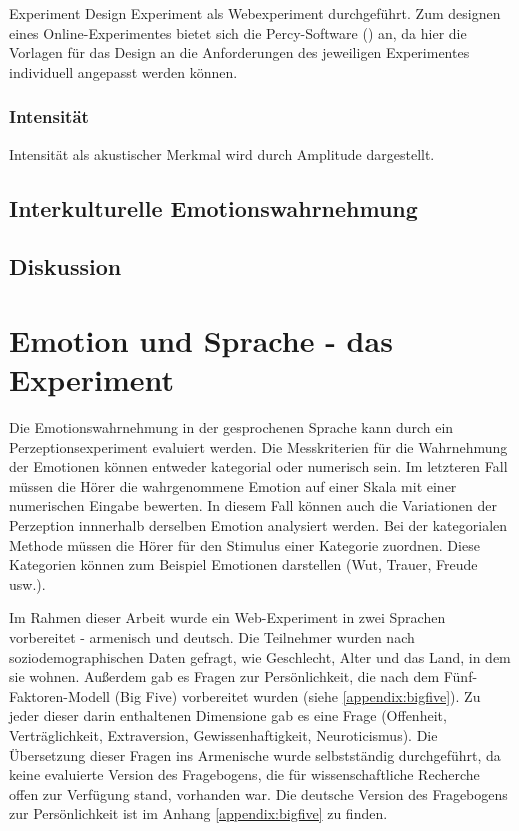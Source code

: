 \documentclass[11pt,a4paper,headsepline,twoside,toc=bibliography]{scrreprt}
\begin{document}
\bigskip

Experiment Design
Experiment als Webexperiment durchgeführt.
Zum designen eines Online-Experimentes bietet sich die Percy-Software (\cite{Draxler2011}) an, da hier die Vorlagen für das Design an die Anforderungen des jeweiligen Experimentes individuell angepasst werden können.


\subsection{Intensität}
\label{intensity}

Intensität als akustischer Merkmal wird durch Amplitude dargestellt.



\section{Interkulturelle Emotionswahrnehmung}


\section{Diskussion}
\label{sec:method_discussion}




\chapter{Emotion und Sprache -  das Experiment}
\label{sec:captain}

Die Emotionswahrnehmung in der gesprochenen Sprache kann durch ein Perzeptionsexperiment evaluiert werden. Die Messkriterien für die Wahrnehmung der Emotionen können entweder kategorial oder numerisch sein. Im letzteren Fall müssen die Hörer die wahrgenommene Emotion auf einer Skala mit einer numerischen Eingabe bewerten. In diesem Fall können auch die Variationen der Perzeption innnerhalb derselben Emotion analysiert werden. Bei der kategorialen Methode müssen die Hörer für den Stimulus einer Kategorie zuordnen. Diese Kategorien können zum Beispiel Emotionen darstellen (Wut, Trauer, Freude usw.).  


Im Rahmen dieser Arbeit wurde ein Web-Experiment in zwei Sprachen vorbereitet - armenisch und deutsch. Die Teilnehmer wurden nach soziodemographischen Daten gefragt, wie Geschlecht, Alter und das Land, in dem sie wohnen. Außerdem gab es Fragen zur Persönlichkeit, die nach dem Fünf-Faktoren-Modell (Big Five) vorbereitet wurden (siehe \ref{appendix:bigfive}). Zu jeder dieser darin enthaltenen Dimensione gab es eine Frage (Offenheit, Verträglichkeit, Extraversion, Gewissenhaftigkeit, Neuroticismus). Die Übersetzung dieser Fragen ins Armenische wurde selbstständig durchgeführt, da keine evaluierte Version des Fragebogens, die für wissenschaftliche Recherche offen zur Verfügung stand, vorhanden war. Die deutsche Version des Fragebogens zur Persönlichkeit ist im Anhang \ref{appendix:bigfive} zu finden. 
\end{document}
